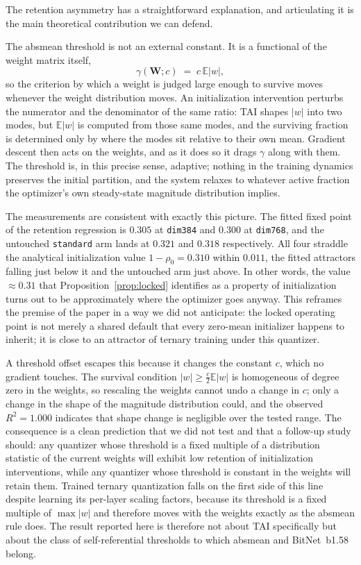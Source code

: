 \documentclass[final,5p,times,twocolumn]{elsarticle}
\theoremstyle{remark}
\newcommand{\E}{\mathbb{E}}
\newcommand{\Wm}{\mathbf{W}}
\newcommand{\rhoz}{\rho_{0}}
\begin{document}
The retention asymmetry has a straightforward explanation, and articulating it
is the main theoretical contribution we can defend.

The absmean threshold is not an external constant. It is a functional of the
weight matrix itself,
\begin{equation}
\label{eq:selfref}
\gamma(\Wm; c) \;=\; c\,\E|w|,
\end{equation}
so the criterion by which a weight is judged large enough to survive moves
whenever the weight distribution moves. An initialization intervention perturbs
the numerator and the denominator of the same ratio: TAI shapes $|w|$ into two
modes, but $\E|w|$ is computed from those same modes, and the surviving
fraction is determined only by where the modes sit relative to their own
mean. Gradient descent then acts on the weights, and as it does so it drags
$\gamma$ along with them. The threshold is, in this precise sense, adaptive;
nothing in the training dynamics preserves the initial partition, and the
system relaxes to whatever active fraction the optimizer's own steady-state
magnitude distribution implies.

The measurements are consistent with exactly this picture. The fitted fixed
point of the retention regression is $0.305$ at \texttt{dim384} and $0.300$ at
\texttt{dim768}, and the untouched \texttt{standard} arm lands at $0.321$ and
$0.318$ respectively. All four straddle the analytical initialization value
$1 - \rhoz = 0.310$ within $0.011$, the fitted attractors falling just below
it and the untouched arm just above. In other words, the value
$\approx 0.31$ that Proposition~\ref{prop:locked} identifies as a property of
initialization turns out to be approximately where the optimizer goes
anyway. This reframes the premise of the paper in a way we did not anticipate:
the locked operating point is not merely a shared default that every zero-mean
initializer happens to inherit; it is close to an attractor of ternary training
under this quantizer.

A threshold offset escapes this because it changes the constant $c$, which no
gradient touches. The survival condition $|w| \geq \tfrac{c}{2}\E|w|$ is
homogeneous of degree zero in the weights, so rescaling the weights cannot undo
a change in $c$; only a change in the shape of the magnitude
distribution could, and the observed $R^{2} = 1.000$ indicates that shape
change is negligible over the tested range. The consequence is a clean
prediction that we did not test and that a follow-up study should:
any quantizer whose threshold is a fixed multiple of a
distribution statistic of the current weights will exhibit low retention of
initialization interventions, while any quantizer whose threshold is constant
in the weights will retain them. Trained ternary quantization
\cite{zhu2017a} falls on the first side of this line despite learning its
per-layer scaling factors, because its threshold is a fixed multiple of
$\max|w|$ and therefore moves with the weights exactly as the absmean rule
does. The result reported
here is therefore not about TAI specifically but about the class of
self-referential thresholds to which absmean and BitNet~b1.58
\cite{ma2024} belong.
\end{document}
